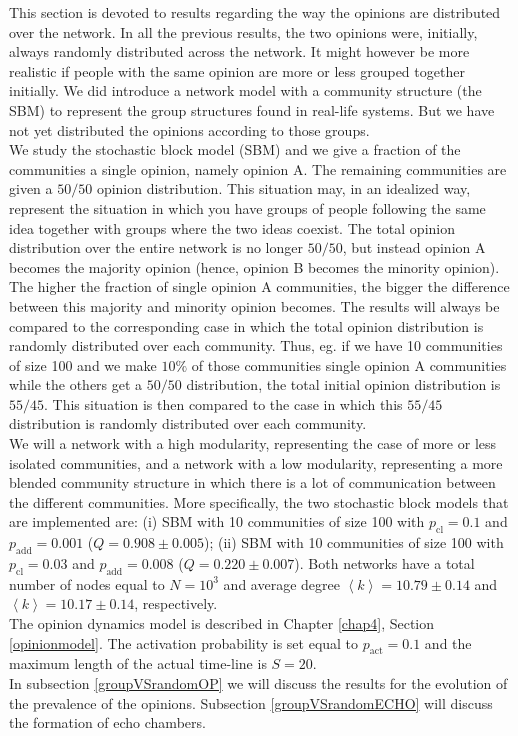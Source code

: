 \documentclass[11 pt , letterpaper , twoside , openright]{book}
\begin{document}
This section is devoted to results regarding the way the opinions are distributed over the network. In all the previous results, the two opinions were, initially, always randomly distributed across the network. It might however be more realistic if people with the same opinion are more or less grouped together initially. We did introduce a network model with a community structure (the SBM) to represent the group structures found in real-life systems. But we have not yet distributed the opinions according to those groups. \\
\newline
We study the stochastic block model (SBM) and we give a fraction of the communities a single opinion, namely opinion A. The remaining communities are given a $50/50$ opinion distribution. This situation may, in an idealized way, represent the situation in which you have groups of people following the same idea together with groups where the two ideas coexist. The total opinion distribution over the entire network is no longer $50/50$, but instead opinion A becomes the majority opinion (hence, opinion B becomes the minority opinion). The higher the fraction of single opinion A communities, the bigger the difference between this majority and minority opinion becomes. The results will always be compared to the corresponding case in which the total opinion distribution is randomly distributed over each community. Thus, eg. if we have 10 communities of size 100 and we make $10 \%$ of those communities single opinion A communities while the others get a $50/50$ distribution, the total initial opinion distribution is $55/45$. This situation is then compared to the case in which this $55/45$ distribution is randomly distributed over each community.\\ 
\newline
We will a network with a high modularity, representing the case of more or less isolated communities, and a network with a low modularity, representing a more blended community structure in which there is a lot of communication between the different communities. More specifically, the two stochastic block models that are implemented are: (i) SBM with 10 communities of size 100 with $p_{\text{cl}} = 0.1$ and $p_{\text{add}} = 0.001$ ($Q = 0.908 \pm 0.005$); (ii) SBM with 10 communities of size 100 with $p_{\text{cl}} = 0.03$ and $p_{\text{add}} = 0.008$ ($Q = 0.220 \pm 0.007$). Both networks have a total number of nodes equal to $N = 10^3$ and average degree $\left<k\right> = 10.79 \pm 0.14$ and $\left<k\right> = 10.17 \pm 0.14$, respectively.\\
\newline
The opinion dynamics model is described in Chapter \ref{chap4}, Section \ref{opinionmodel}. The activation probability is set equal to $p_{\text{act}} = 0.1$ and the maximum length of the actual time-line is $S=20$. \\
\newline
In subsection \ref{groupVSrandomOP} we will discuss the results for the evolution of the prevalence of the opinions. Subsection \ref{groupVSrandomECHO} will discuss the formation of echo chambers.
\end{document}
